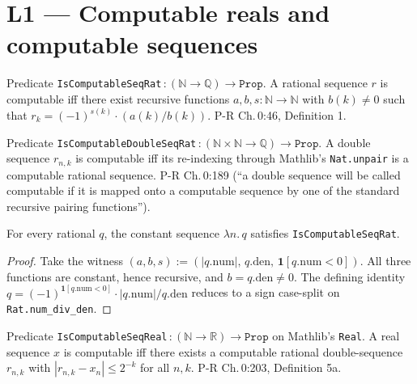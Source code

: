 \chapter{L1 — Computable reals and computable sequences}


\begin{definition}
  \label{def:l1_isComputableSeqRat}
  \leanok
  Predicate \texttt{IsComputableSeqRat}\,$: (\mathbb{N} \to \mathbb{Q}) \to \texttt{Prop}$. A rational sequence $r$ is computable iff there exist recursive functions $a, b, s : \mathbb{N} \to \mathbb{N}$ with $b(k) \ne 0$ such that $r_k = (-1)^{s(k)} \cdot (a(k) / b(k))$. P-R Ch.\,0:46, Definition 1.
\end{definition}

\begin{definition}
  \label{def:l1_isComputableDoubleSeqRat}
  \leanok
  Predicate \texttt{IsComputableDoubleSeqRat}\,$: (\mathbb{N} \times \mathbb{N} \to \mathbb{Q}) \to \texttt{Prop}$. A double sequence $r_{n,k}$ is computable iff its re-indexing through Mathlib's \texttt{Nat.unpair} is a computable rational sequence. P-R Ch.\,0:189 (``a double sequence will be called computable if it is mapped onto a computable sequence by one of the standard recursive pairing functions'').
\end{definition}

\begin{lemma}
  \label{lem:l1_isComputableSeqRat_const}
  \leanok
  For every rational $q$, the constant sequence $\lambda n.\,q$ satisfies \texttt{IsComputableSeqRat}.
\end{lemma}
\begin{proof}\leanok
  Take the witness $(a,b,s) := (|q.\mathrm{num}|,\, q.\mathrm{den},\, \mathbf{1}[q.\mathrm{num} < 0])$. All three functions are constant, hence recursive, and $b = q.\mathrm{den} \ne 0$. The defining identity $q = (-1)^{\mathbf{1}[q.\mathrm{num}<0]} \cdot |q.\mathrm{num}| / q.\mathrm{den}$ reduces to a sign case-split on \texttt{Rat.num\_div\_den}.
\end{proof}

\begin{definition}
  \label{def:l1_isComputableSeqReal}
  \leanok
  Predicate \texttt{IsComputableSeqReal}\,$: (\mathbb{N} \to \mathbb{R}) \to \texttt{Prop}$ on Mathlib's \texttt{Real}. A real sequence $x$ is computable iff there exists a computable rational double-sequence $r_{n,k}$ with $|r_{n,k} - x_n| \le 2^{-k}$ for all $n, k$. P-R Ch.\,0:203, Definition 5a.
\end{definition}

